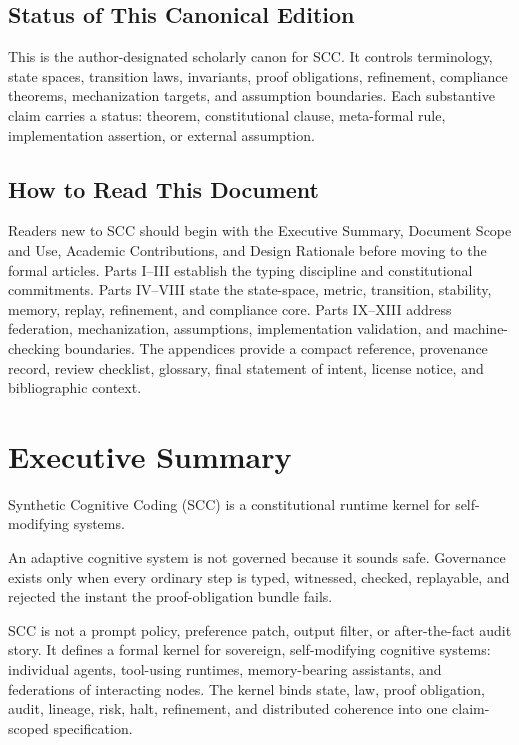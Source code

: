 \documentclass[10pt,oneside]{article}
\theoremstyle{definition}
\theoremstyle{remark}
\begin{document}
\subsection*{Status of This Canonical Edition}
This is the author-designated scholarly canon for SCC. It controls terminology, state spaces, transition laws, invariants, proof obligations, refinement, compliance theorems, mechanization targets, and assumption boundaries. Each substantive claim carries a status: theorem, constitutional clause, meta-formal rule, implementation assertion, or external assumption.

\subsection*{How to Read This Document}
Readers new to SCC should begin with the Executive Summary, Document Scope and Use, Academic Contributions, and Design Rationale before moving to the formal articles. Parts I--III establish the typing discipline and constitutional commitments. Parts IV--VIII state the state-space, metric, transition, stability, memory, replay, refinement, and compliance core. Parts IX--XIII address federation, mechanization, assumptions, implementation validation, and machine-checking boundaries. The appendices provide a compact reference, provenance record, review checklist, glossary, final statement of intent, license notice, and bibliographic context.


\tableofcontents
\listoffigures
\listoftables
\newpage
{}


\section{Executive Summary}
Synthetic Cognitive Coding (SCC) is a constitutional runtime kernel for self-modifying systems.

An adaptive cognitive system is not governed because it sounds safe. Governance exists only when every ordinary step is typed, witnessed, checked, replayable, and rejected the instant the proof-obligation bundle fails.

SCC is not a prompt policy, preference patch, output filter, or after-the-fact audit story. It defines a formal kernel for sovereign, self-modifying cognitive systems: individual agents, tool-using runtimes, memory-bearing assistants, and federations of interacting nodes. The kernel binds state, law, proof obligation, audit, lineage, risk, halt, refinement, and distributed coherence into one claim-scoped specification.
\end{document}
